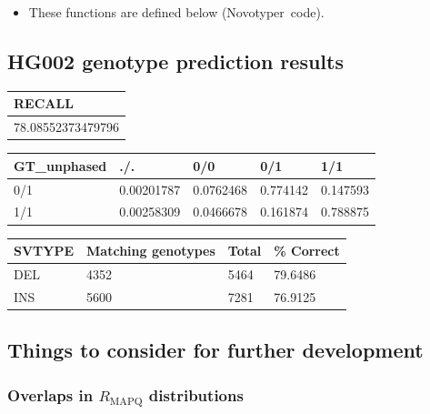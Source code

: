 \documentclass{article}
\begin{document}
\begin{itemize}
\item These functions are defined below (Novotyper~code).
\end{itemize}

\subsection{HG002 genotype prediction results}

\bigskip\noindent
\begin{tabular}{p{\dimexpr \linewidth-2\tabcolsep}}
\toprule
RECALL \\
\hline
78.08552373479796 \\
\bottomrule
\end{tabular}

\bigskip\bigskip\noindent
\begin{tabular}{p{}p{}p{}p{}p{}}
\toprule
GT\_unphased & ./. & 0/0 & 0/1 & 1/1 \\
\hline
0/1 & 0.00201787 & 0.0762468 & 0.774142 & 0.147593 \\
1/1 & 0.00258309 & 0.0466678 & 0.161874 & 0.788875 \\
\bottomrule
\end{tabular}

\bigskip\bigskip\noindent
\begin{tabular}{p{}p{}p{}p{}}
\toprule
SVTYPE & Matching genotypes & Total & \% Correct \\
\hline
DEL & 4352 & 5464 & 79.6486 \\
INS & 5600 & 7281 & 76.9125 \\
\bottomrule
\end{tabular}

\bigskip\subsection{Things to consider for further development}

\subsubsection{Overlaps in $R_{\text{MAPQ}}$ distributions}
\end{document}
